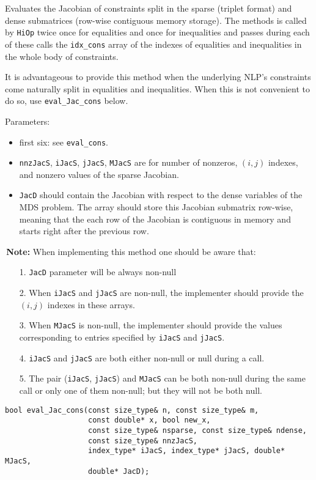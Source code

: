 \documentclass[11pt]{article}
\newcommand{\warningSymbol}{\raisebox{0.9\depth}{\danger}}
\newcommand{\warningcp}[1]{%
        \smallskip \noindent \textcolor{warningColorText}{\warningSymbol{}}\,\textbf{#1} %
    }
\newcommand{\Hi}{\texttt{HiOp}\xspace}
\begin{document}
Evaluates the Jacobian of constraints split in the sparse (triplet format) and dense submatrices (row-wise contiguous memory storage). The methods is called by \Hi twice once for equalities and once for inequalities and passes during each of these calls  the \texttt{idx\_cons} array of the indexes of equalities and inequalities in the whole body of constraints.

It is advantageous to provide
this method when the underlying NLP's constraints come naturally split in equalities
and inequalities. When this is not convenient to do so, use \texttt{eval\_Jac\_cons} below.

Parameters:
\begin{itemize} 
\item first six: see \texttt{eval\_cons}.
\item \texttt{nnzJacS}, \texttt{iJacS}, \texttt{jJacS}, \texttt{MJacS} are for number of nonzeros, $(i,j)$ indexes, and nonzero values of   the sparse Jacobian.
\item \texttt{JacD} should contain the Jacobian with respect to the dense variables of the MDS problem. The array should store this Jacobian submatrix row-wise, meaning that the each row of the Jacobian is contiguous in memory and starts right after the previous row.
\end{itemize}

\warningcp{Note:} When implementing this method one should be aware that:
\begin{itemize}
\item[1.] \texttt{JacD} parameter will be always non-null
\item[2.] When \texttt{iJacS} and \texttt{jJacS} are non-null, the implementer should provide the $(i,j)$   indexes in these arrays. 
\item[3.] When \texttt{MJacS} is non-null, the implementer should provide the values corresponding to    entries specified by \texttt{iJacS} and \texttt{jJacS}.
\item[4.] \texttt{iJacS} and \texttt{jJacS} are both either non-null or null during a call.
\item[5.] The pair (\texttt{iJacS}, \texttt{jJacS}) and \texttt{MJacS} can be both non-null during the same call or only one of them  non-null; but they will not be both null.
\end{itemize}


\begin{lstlisting}
bool eval_Jac_cons(const size_type& n, const size_type& m, 
                   const double* x, bool new_x,
                   const size_type& nsparse, const size_type& ndense,
                   const size_type& nnzJacS,
                   index_type* iJacS, index_type* jJacS, double* MJacS,
                   double* JacD);
\end{lstlisting} 
\end{document}
